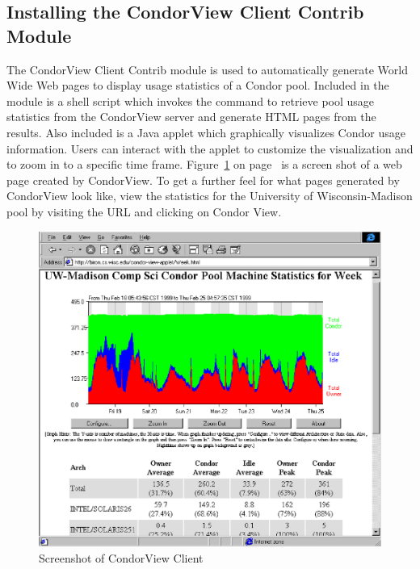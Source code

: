 \subsection{\label{sec:CondorView-Client-Install}
Installing the CondorView Client Contrib Module} 

\newcommand{\MakeStats}{\Prog{make\_stats}}

The CondorView Client Contrib module is used to automatically generate
World Wide Web pages to display usage statistics of a Condor
pool.
Included in the module is a shell script which invokes the 
command to retrieve pool usage statistics from the CondorView server and
generate HTML pages from the results.  
Also included is a Java applet which graphically visualizes Condor 
usage information.  
Users can interact with the applet to customize the visualization and to
zoom in to a specific time frame.
Figure~\ref{fig:view-screenshot} on page~\pageref{fig:view-screenshot}
is a screen shot of a web page created by CondorView.  
To get a further feel for what pages generated by CondorView look like,
view the statistics for the University of Wisconsin-Madison pool
by visiting the URL  and clicking on
Condor View.

\begin{figure}[hbt]
\centering
\includegraphics{admin-man/view-screenshot.ps}
\caption{\label{fig:view-screenshot}Screenshot of CondorView Client}
\end{figure}

